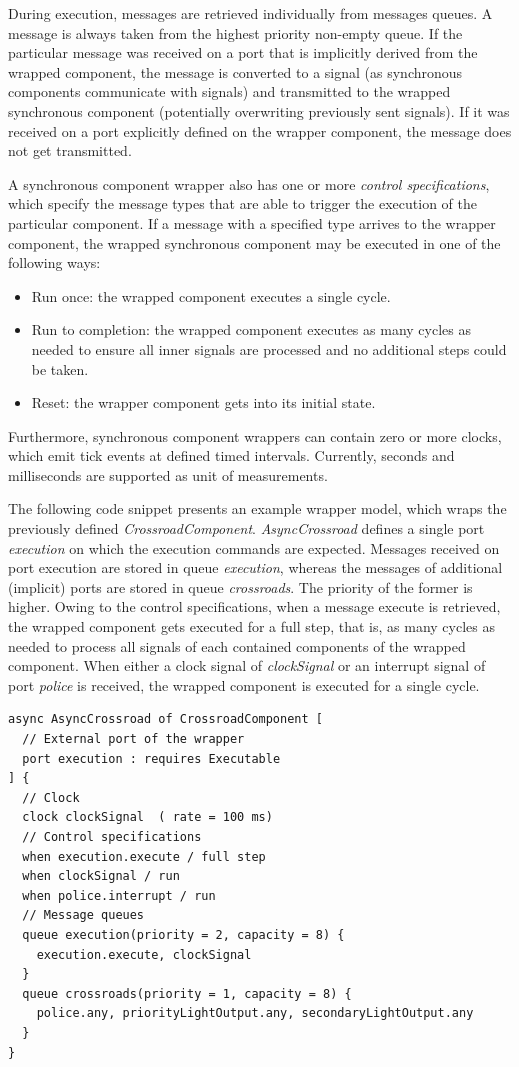 During execution, messages are retrieved individually from messages queues. A message
is always taken from the highest priority non-empty queue. If the particular message was
received on a port that is implicitly derived from the wrapped component, the message is
converted to a signal (as synchronous components communicate with signals) and transmitted
to the wrapped synchronous component (potentially overwriting previously sent signals). If
it was received on a port explicitly defined on the wrapper component, the message does not
get transmitted.

A synchronous component wrapper also has one or more \emph{control specifications}, which
specify the message types that are able to trigger the execution of the particular component.
If a message with a specified type arrives to the wrapper component, the wrapped synchronous
component may be executed in one of the following ways:
\begin{itemize}
	\item Run once: the wrapped component executes a single cycle.
	\item Run to completion: the wrapped component executes as many cycles as needed to
	ensure all inner signals are processed and no additional steps could be taken.
	\item Reset: the wrapper component gets into its initial state.
\end{itemize}

Furthermore, synchronous component wrappers can contain zero or more clocks, which emit tick
events at defined timed intervals. Currently, seconds and milliseconds are supported as unit of measurements.

The following code snippet presents an example wrapper model, which wraps the previously defined \textsl{CrossroadComponent}. \textsl{AsyncCrossroad} defines a single port \textsl{execution} on which the execution commands
are expected. Messages received on port execution are stored in queue \textsl{execution}, whereas
the messages of additional (implicit) ports are stored in queue \textsl{crossroads}. The priority of
the former is higher. Owing to the control specifications, when a message execute is retrieved,
the wrapped component gets executed for a full step, that is, as many cycles as needed to
process all signals of each contained components of the wrapped component. When either
a clock signal of \textsl{clockSignal} or an interrupt signal of port \textsl{police} is received, the wrapped
component is executed for a single cycle.
\begin{lstlisting}
async AsyncCrossroad of CrossroadComponent [
  // External port of the wrapper
  port execution : requires Executable
] {
  // Clock
  clock clockSignal  ( rate = 100 ms)
  // Control specifications
  when execution.execute / full step
  when clockSignal / run
  when police.interrupt / run
  // Message queues
  queue execution(priority = 2, capacity = 8) {
    execution.execute, clockSignal
  }
  queue crossroads(priority = 1, capacity = 8) {
    police.any, priorityLightOutput.any, secondaryLightOutput.any
  }
}
\end{lstlisting}
